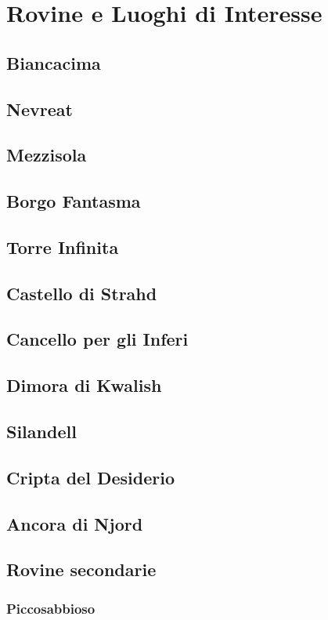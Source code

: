 \documentclass[10pt,twoside,onecolumn,openany]{book}
\begin{document}
\section{Rovine e Luoghi di Interesse}
\subsection{Biancacima}
\newpage
\subsection{Nevreat}
\newpage
\subsection{Mezzisola}
\newpage
\subsection{Borgo Fantasma}
\newpage
\subsection{Torre Infinita}
\newpage
\subsection{Castello di Strahd}
\newpage
\subsection{Cancello per gli Inferi}
\newpage
\subsection{Dimora di Kwalish}
\newpage
\subsection{Silandell}
\newpage
\subsection{Cripta del Desiderio}
\newpage
\subsection{Ancora di Njord}
\newpage
\subsection{Rovine secondarie}
\subsubsection{Piccosabbioso}
\newpage
\end{document}

